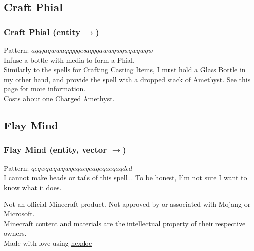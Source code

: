 \documentclass[12pt]{article}
\begin{document}
\label{sec:patterns/great_spells/make_battery}
\subsection*{Craft Phial}


  \label{sec: patterns/great_spells/make_battery@hexcasting:craft/battery}
\subsubsection*{Craft Phial (entity $\rightarrow$)}

    Pattern: $aqqqaqwwaqqqqqeqaqqqawwqwqwqwqwqw$\\
      Infuse a bottle with media to form a Phial.\\


  
    Similarly to the spells for Crafting Casting Items, I must hold a Glass Bottle in my other hand, and provide the spell with a dropped stack of Amethyst. See this page for more information.\\Costs about one Charged Amethyst.\\

\newpage

\label{sec:patterns/great_spells/brainsweep}
\subsection*{Flay Mind}


  \label{sec: patterns/great_spells/brainsweep@hexcasting:brainsweep}
\subsubsection*{Flay Mind (entity, vector $\rightarrow$)}

    Pattern: $qeqwqwqwqwqeqaeqeaqeqaeqaqded$\\
      I cannot make heads or tails of this spell... To be honest, I$\rq$m not sure I want to know what it does.\\

\newpage





\bigskip

Not an official Minecraft product. Not approved by or associated with Mojang or Microsoft. \\
Minecraft content and materials are the intellectual property of their respective owners. \\
Made with love using \href{https://pypi.org/project/hexdoc/}{hexdoc}
\end{document}
